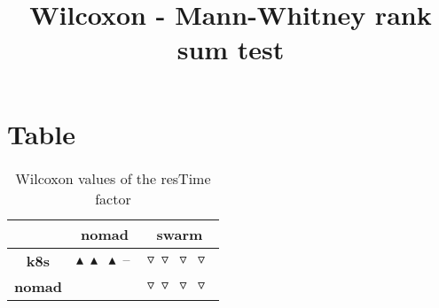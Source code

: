 \documentclass{article}
\title{Wilcoxon - Mann-Whitney rank sum test}
\author{}
\begin{document}
\maketitle
\section{Table}
\begin{table}[!htp]
  \caption{Wilcoxon values of the resTime factor}
  \label{table:resTime}
  \centering
  \begin{scriptsize}
  \begin{tabular}{c|cc}
      & \textbf{nomad} & \textbf{swarm} \\\hline
      \textbf{k8s} & $\blacktriangle\ \blacktriangle\ \blacktriangle\ \text{--}\  $ & $ \triangledown\ \triangledown\ \triangledown\ \triangledown\ $ \\
      \textbf{nomad} & $ $ & $ \triangledown\ \triangledown\ \triangledown\ \triangledown\ $ \\
  \end{tabular}
  \end{scriptsize}
\end{table}
\end{document}
